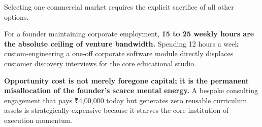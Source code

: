 Selecting one commercial market requires the explicit sacrifice of all other options.

For a founder maintaining corporate employment, \textbf{15 to 25 weekly hours are the absolute ceiling of venture bandwidth.} Spending 12 hours a week custom-engineering a one-off corporate software module directly displaces customer discovery interviews for the core educational studio.

\textbf{Opportunity cost is not merely foregone capital; it is the permanent misallocation of the founder's scarce mental energy.} A bespoke consulting engagement that pays ₹4,00,000 today but generates zero reusable curriculum assets is strategically expensive because it starves the core institution of execution momentum.

